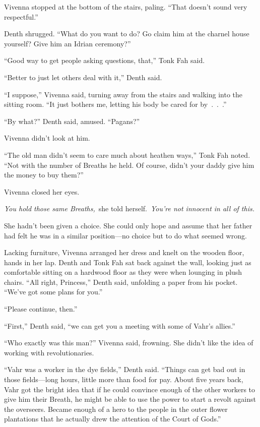 Vivenna stopped at the bottom of the stairs, paling. “That doesn’t sound very respectful.”

Denth shrugged. “What do you want to do? Go claim him at the charnel house yourself? Give him an Idrian ceremony?”

“Good way to get people asking questions, that,” Tonk Fah said.

“Better to just let others deal with it,” Denth said.

“I suppose,” Vivenna said, turning away from the stairs and walking into the sitting room. “It just bothers me, letting his body be cared for by~.~.~.”

“By what?” Denth said, amused. “Pagans?”

Vivenna didn’t look at him.

“The old man didn’t seem to care much about heathen ways,” Tonk Fah noted. “Not with the number of Breaths he held. Of course, didn’t your daddy give him the money to buy them?”

Vivenna closed her eyes.

\textit{You hold those same Breaths,}~she told herself.~\textit{You’re not innocent in all of this.}

She hadn’t been given a choice. She could only hope and assume that her father had felt he was in a similar position—no choice but to do what seemed wrong.

Lacking furniture, Vivenna arranged her dress and knelt on the wooden floor, hands in her lap. Denth and Tonk Fah sat back against the wall, looking just as comfortable sitting on a hardwood floor as they were when lounging in plush chairs. “All right, Princess,” Denth said, unfolding a paper from his pocket. “We’ve got some plans for you.”

“Please continue, then.”

“First,” Denth said, “we can get you a meeting with some of Vahr’s allies.”

“Who exactly was this man?” Vivenna said, frowning. She didn’t like the idea of working with revolutionaries.

“Vahr was a worker in the dye fields,” Denth said. “Things can get bad out in those fields—long hours, little more than food for pay. About five years back, Vahr got the bright idea that if he could convince enough of the other workers to give him their Breath, he might be able to use the power to start a revolt against the overseers. Became enough of a hero to the people in the outer flower plantations that he actually drew the attention of the Court of Gods.”


